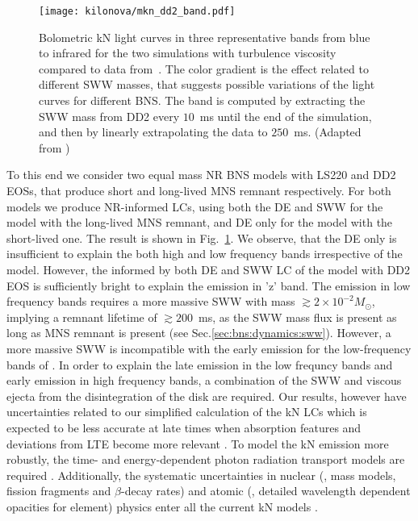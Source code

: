 \begin{figure}[t]
    \centering
    \texttt{[image: kilonova/mkn\_dd2\_band.pdf]}
    \caption{Bolometric kN light curves in three representative bands from blue to
        infrared for the two simulations with turbulence viscosity compared to
        \AT{} data from~\citep{Villar:2017wcc}.
        The color gradient is the effect related to different
        \ac{SWW} masses, that suggests possible variations of the light
        curves for different \ac{BNS}. The band is computed by extracting the
        \ac{SWW} mass from DD2 every $10$~ms until the end of the simulation, and
        then by linearly extrapolating the data to $250$~ms.
        (Adapted from \citet{Nedora:2019jhl})
    }
    \label{fig:knlc}
\end{figure}

To this end we consider two equal mass \ac{NR} \ac{BNS} models with LS220 and DD2 \acp{EOS}, that produce short and long-lived \ac{MNS} remnant respectively. 
For both models we produce \ac{NR}-informed \acp{LC}, using both the \ac{DE} and \ac{SWW} for the model with the long-lived \ac{MNS} remnant, and \ac{DE} only for the model with the short-lived one.
The result is shown in Fig.~\ref{fig:knlc}.
We observe, that the \ac{DE} only is insufficient to explain the \AT{} both high and low frequency bands irrespective of the model. However, the informed by both \ac{DE} and \ac{SWW} \ac{LC} of the model with DD2 \ac{EOS} is sufficiently bright to explain the emission in 'z' band. 
The emission in low frequency bands requires a more massive 
\ac{SWW} with mass ${\gtrsim} 2\times10^{-2}M_{\odot}$, implying a remnant lifetime of ${\gtrsim}200$~ms, as the \ac{SWW} mass flux is present as long 
as \ac{MNS} remnant is present (see Sec.\ref{sec:bns:dynamics:sww}).
However, a more massive \ac{SWW} is incompatible with
the early emission for the low-frequency bands of \AT{}.
In order to explain the late emission in the low frequncy bands and 
early emission in high frequency bands, a combination of the \ac{SWW} and 
viscous ejecta from the disintegration of the disk are required.
Our results, however have uncertainties related to our simplified calculation of
the \ac{kN} \acp{LC} which is expected to be less accurate at
late times when absorption features and deviations from \ac{LTE} become more relevant \citep[see \eg][]{Smartt:2017fuw}.
To model the \ac{kN} emission more robustly, the time- and energy-dependent 
photon radiation transport models are required 
\citep{Kasen:2017sxr,Tanaka:2017qxj,Miller:2019dpt,Bulla:2019muo}.
Additionally, the systematic uncertainties in
nuclear (\eg, mass models, fission fragments and $\beta$-decay
rates) and atomic (\eg, detailed wavelength dependent opacities for
\rproc{} element) physics enter all the current \ac{kN} models 
\citep{Eichler:2014kma,Rosswog:2016dhy,Gaigalas:2019ptx}.




